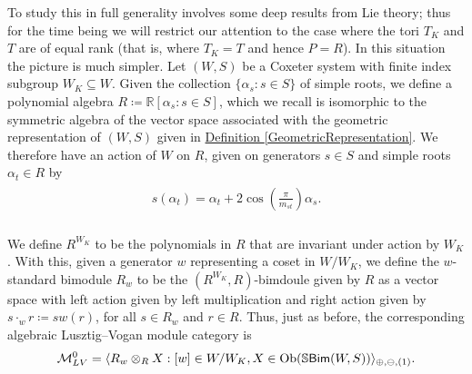 \noindent To study this in full generality involves some deep results from Lie theory; thus for the time being we will restrict our attention to the case where the tori $T_K$ and $T$ are of equal rank (that is, where $T_K = T$ and hence $P = R$). In this situation the picture is much simpler. Let $(W, S)$ be a Coxeter system with finite index subgroup $W_K \subseteq W$. Given the collection $\{\alpha_s : s \in S\}$ of simple roots, we define a polynomial algebra $R \coloneqq \mathbb{R}[\alpha_s : s \in S]$, which we recall is isomorphic to the symmetric algebra of the vector space associated with the geometric representation of $(W, S)$ given in \hyperref[GeometricRepresentation]{Definition \ref*{GeometricRepresentation}}. We therefore have an action of $W$ on $R$, given on generators $s \in S$ and simple roots $\alpha_t \in R$ by\\[-1.1\linespacing]
\begin{align*}
\begin{split}
s(\alpha_t) = \alpha_t + 2\cos\!\left(\frac{\pi}{m_{st}}\right)\!\alpha_s.
\end{split}
\end{align*}
\noindent\\[-0.6\linespacing] We define $R^{W_K}$ to be the polynomials in $R$ that are invariant under action by $W_K$. With this, given a generator $w$ representing a coset in $W/W_K$, we define the $w$-standard bimodule $R_w$ to be the $(R^{W_K}, R)$-bimdoule given by $R$ as a vector space with left action given by left multiplication and right action given by $s \cdot_w r \coloneqq s w(r)$, for all $s \in R_w$ and $r \in R$. Thus, just as before, the corresponding algebraic Lusztig--Vogan module category is
\begin{align*}
\begin{split}
\mathcal{M}_{LV}^0 = \langle R_w \otimes_R X : [w] \in W/W_K, X \in \textnormal{Ob}(\mathbb{S}\textnormal{\textsf{Bim}}(W, S))\rangle_{\oplus,\ominus,(1)}.
\end{split}
\end{align*}
\newpage

